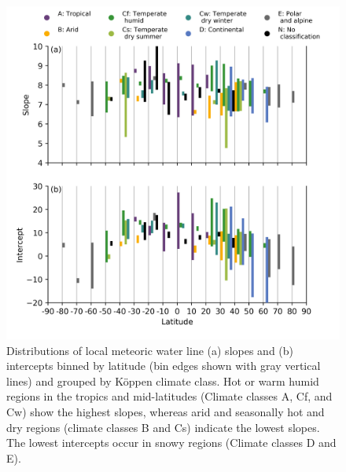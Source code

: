 \documentclass[draft, linenumbers]{agujournal2018}
\begin{document}
\begin{figure}
  \centering
  \includegraphics[width=6in]{Figs/Fig3.png}
  \caption{Distributions of local meteoric water line (a) slopes and (b) intercepts binned by latitude (bin edges shown with gray vertical lines) and grouped by K{\"o}ppen climate class. Hot or warm humid regions in the tropics and mid-latitudes (Climate classes A, Cf, and Cw) show the highest slopes, whereas arid and seasonally hot and dry regions (climate classes B and Cs) indicate the lowest slopes. The lowest intercepts occur in snowy regions (Climate classes D and E).}
  \label{fig:zonalboxplot}
\end{figure}
\end{document}
